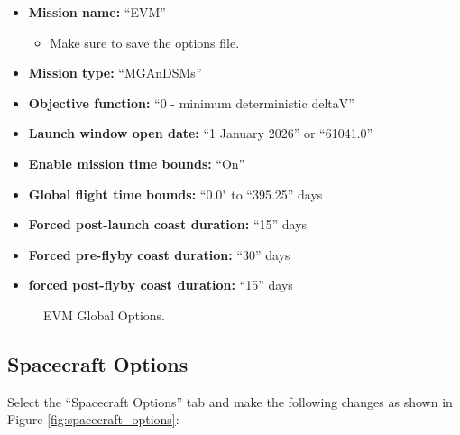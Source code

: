 \documentclass[11pt]{article}
\begin{document}
\begin{itemize}
	\item \textbf{Mission name:} ``EVM''
	\begin{itemize}
		\item Make sure to save the options file.
	\end{itemize}
	\item \textbf{Mission type:} ``\acs{MGAnDSMs}''
	\item \textbf{Objective function:} ``0 - minimum deterministic deltaV''
	\item \textbf{Launch window open date:} ``1 January 2026'' or ``61041.0''
	\item \textbf{Enable mission time bounds:} ``On''
	\item \textbf{Global flight time bounds:} ``0.0" to ``395.25'' days
	\item \textbf{Forced post-launch coast duration:} ``15'' days
	\item \textbf{Forced pre-flyby coast duration:} ``30'' days
	\item \textbf{forced post-flyby coast duration:} ``15'' days
\end{itemize}

\begin{figure}[H]
	\centering
	\caption{\label{fig:global_options}EVM Global Options.}
\end{figure}

\subsection{Spacecraft Options}
\label{sec:spacecraft_options}

Select the ``Spacecraft Options'' tab and make the following changes as shown in Figure \ref{fig:spacecraft_options}:
\end{document}
